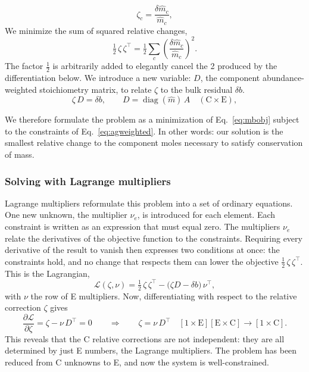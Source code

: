 \begin{equation}
  \zeta_c = \frac{\delta\hat m_c}{\hat m_c},
  \label{eq:zeta}
\end{equation}
We minimize the sum of squared relative changes,
\begin{equation}
  \tfrac12\, \zeta\, \zeta^{\!\top}
  = \tfrac12 \sum_c \left(\frac{\delta\hat m_c}{\hat m_c}\right)^{\!2}.
  \label{eq:mbobj}
\end{equation}
The factor $\tfrac12$ is arbitrarily added to elegantly cancel the 2 produced by the differentiation below. We introduce
a new variable: $D$, the component abundance-weighted stoichiometry matrix, to relate $\zeta$ to the bulk residual $\delta b$.
\begin{equation}
  \zeta\, D = \delta b,
  \qquad
  D = \operatorname{diag}(\hat m)\, A \quad (\text{C}\times\text{E}),
  \label{eq:agweighted}
\end{equation}

We therefore formulate the problem as a minimization of Eq.~\eqref{eq:mbobj} subject to the constraints of Eq.~\eqref{eq:agweighted}. 
In other words: our solution is the smallest relative change to the component moles necessary to satisfy conservation of mass. 

\subsubsection{Solving with Lagrange multipliers}
\label{sec:mb-lagrange}

Lagrange multipliers reformulate this problem into a set of ordinary equations. One new unknown, the
multiplier $\nu_e$, is introduced for each element. Each constraint is written as an expression that must equal zero.
The multipliers $\nu_e$ relate the derivatives of the objective function to the constraints. Requiring every derivative 
of the result to vanish then expresses two conditions at once: the constraints hold, and no change that respects them
can lower the objective $ \tfrac12\, \zeta\, \zeta^{\!\top}$. This is the Lagrangian,
\begin{equation}
  \mathcal{L}(\zeta, \nu)
  = \tfrac12\, \zeta\,\zeta^{\!\top} - \big( \zeta D - \delta b \big)\, \nu^{\!\top},
  \label{eq:lagrangian}
\end{equation}
with $\nu$ the row of E multipliers. Now, differentiating with respect to the
relative correction $\zeta$ gives
\begin{equation}
  \frac{\partial \mathcal{L}}{\partial \zeta} = \zeta - \nu\, D^{\!\top} = 0
  \qquad\Longrightarrow\qquad
  \zeta = \nu\, D^{\!\top}
  \quad [1\times\text{E}][\text{E}\times\text{C}] \to [1\times\text{C}].
  \label{eq:ystat}
\end{equation}
This reveals that the C relative corrections are not independent: they are all determined
by just E numbers, the Lagrange multipliers. The problem has been reduced from C unknowns to E,
and now the system is well-constrained.

